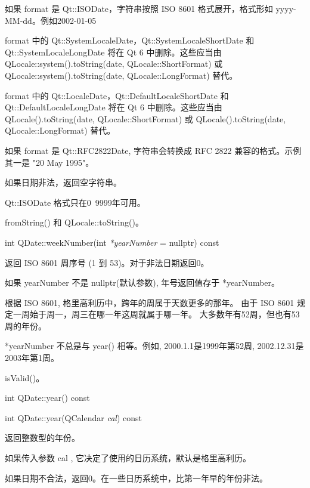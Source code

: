 如果 format 是 Qt::ISODate，字符串按照 ISO 8601 格式展开，格式形如 yyyy-MM-dd。例如2002-01-05

format 中的 Qt::SystemLocaleDate，Qt::SystemLocaleShortDate 和Qt::SystemLocaleLongDate 将在 Qt 6 中删除。这些应当由 QLocale::system().toString(date, QLocale::ShortFormat) 或 QLocale::system().toString(date, QLocale::LongFormat) 替代。

format 中的 Qt::LocaleDate，Qt::DefaultLocaleShortDate 和Qt::DefaultLocaleLongDate 将在 Qt 6 中删除。这些应当由 QLocale().toString(date, QLocale::ShortFormat) 或 QLocale().toString(date, QLocale::LongFormat) 替代。

如果 format 是 Qt::RFC2822Date, 字符串会转换成 RFC 2822 兼容的格式。示例其一是 "20 May 1995"。

如果日期非法，返回空字符串。


\begin{notice}[警告]
Qt::ISODate 格式只在0~9999年可用。
\end{notice}

\begin{notice}[另请参阅]
fromString() 和 QLocale::toString()。
\end{notice}


\splitLine

int QDate::weekNumber(int \emph{*yearNumber} = nullptr) const

返回 ISO 8601 周序号 (1 到 53)。对于非法日期返回0。

如果 yearNumber 不是 nullptr(默认参数), 年号返回值存于 *yearNumber。

根据 ISO 8601, 格里高利历中，跨年的周属于天数更多的那年。 由于 ISO 8601 规定一周始于周一，周三在哪一年这周就属于哪一年。 大多数年有52周，但也有53周的年份。

\begin{notice}
 *yearNumber 不总是与 year() 相等。例如, 2000.1.1是1999年第52周, 2002.12.31是2003年第1周。
\end{notice}

\begin{notice}[另请参阅]
isValid()。
\end{notice}

\splitLine

int QDate::year() const

int QDate::year(QCalendar \emph{cal}) const

返回整数型的年份。

如果传入参数 cal , 它决定了使用的日历系统，默认是格里高利历。

如果日期不合法，返回0。在一些日历系统中，比第一年早的年份非法。

